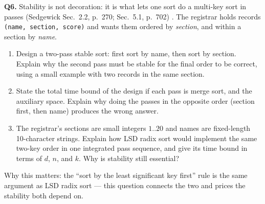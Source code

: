 \documentclass[11pt]{article}
\begin{document}
\textbf{Q6.} Stability is not decoration: it is what lets one sort do a multi-key sort in passes (Sedgewick Sec.~2.2, p.~270; Sec.~5.1, p.~702) \cite{Sedgewick2011_algorithms}. The registrar holds records \texttt{(name, section, score)} and wants them ordered by \emph{section}, and within a section by \emph{name}.
\begin{enumerate}
  \item[(a)] Design a two-pass stable sort: first sort by name, then sort by section. Explain why the second pass must be stable for the final order to be correct, using a small example with two records in the same section.
  \item[(b)] State the total time bound of the design if each pass is merge sort, and the auxiliary space. Explain why doing the passes in the opposite order (section first, then name) produces the wrong answer.
  \item[(c)] The registrar's sections are small integers $1..20$ and names are fixed-length 10-character strings. Explain how LSD radix sort would implement the same two-key order in one integrated pass sequence, and give its time bound in terms of $d$, $n$, and $k$. Why is stability still essential?
\end{enumerate}
Why this matters: the ``sort by the least significant key first'' rule is the same argument as LSD radix sort --- this question connects the two and prices the stability both depend on.



\end{document}
